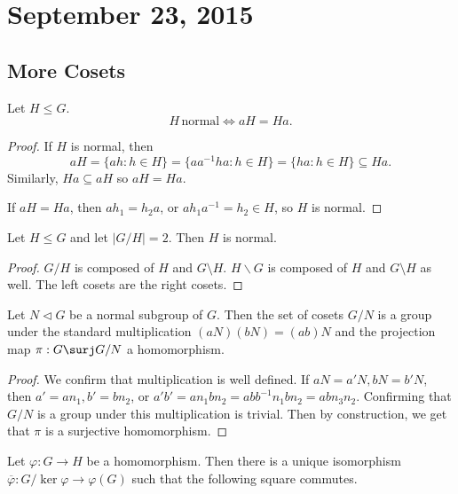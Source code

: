 \section{September 23, 2015}

\subsection{More Cosets}

\begin{prop}
Let $H \leq G$.
\[ H\,\textrm{normal} \iff aH = Ha. \]
\end{prop}

\begin{proof}
If $H$ is normal, then
\[ aH = \lbrace ah : h \in H \rbrace = \lbrace aa^{-1}ha : h \in H
\rbrace = \lbrace ha : h \in H \rbrace \subseteq Ha. \]
Similarly, $Ha \subseteq aH$ so $aH = Ha$.

If $aH = Ha$, then $ah_1 = h_2a$, or $ah_1a^{-1} = h_2 \in H$, so $H$ is
normal.
\end{proof}

\begin{cor}
Let $H \leq G$ and let $\lvert G / H \rvert = 2$. Then $H$ is normal.
\end{cor}

\begin{proof}
$G/H$ is composed of $H$ and $G \setminus H$. $H \backslash G$ is
composed of $H$ and $G \setminus H$ as well. The left cosets are the
right cosets.
\end{proof}

\begin{thm}
Let $N \lhd G$ be a normal subgroup of $G$. Then the set of cosets $G /
N$ is a group under the standard multiplication $(aN)(bN) = (ab)N$ and
the projection map $\pi : G \surj G / N$ a homomorphism.
\end{thm}

\begin{proof}
We confirm that multiplication is well defined. If $aN = a'N, bN = b'N$,
then $a' = an_1, b' = bn_2$, or $a'b' = an_1bn_2 = abb^{-1}n_1bn_2 =
abn_3n_2$. Confirming that $G/N$ is a group under this multiplication is
trivial. Then by construction, we get that $\pi$ is a surjective
homomorphism.
\end{proof}

\begin{thm}
Let $\varphi : G \to H$ be a homomorphism. Then there is a unique
isomorphism $\overline{\varphi} : G / \ker\varphi \to \varphi(G)$ such
that the following square commutes.
\begin{center}
\end{center}
\end{thm}
